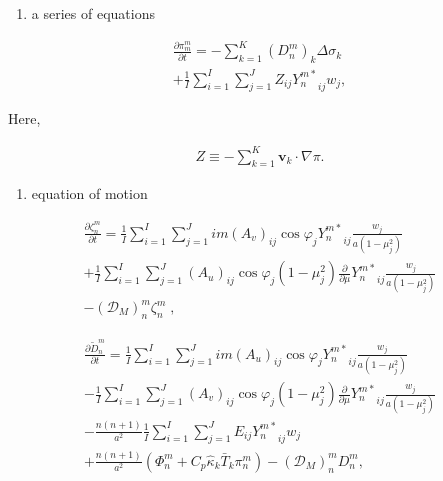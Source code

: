\begin{enumerate}
\def\labelenumi{\arabic{enumi}.}
\tightlist
\item
  a series of equations
\end{enumerate}

\begin{eqnarray}
  \frac{\partial \pi_m^m}{\partial t}
  =  - \sum_{k=1}^{K} (D_n^m)_k \Delta  \sigma_k  \\
     + \frac{1}{I} \sum_{i=1}^{I} \sum_{j=1}^{J}  
               Z_{ij} {Y_n^{m *}}_{ij} w_j  ,
\end{eqnarray}

Here,

\begin{eqnarray}
Z \equiv - \sum_{k=1}^{K} \mathbf{v}_k \cdot \nabla \pi .
\end{eqnarray}

\begin{enumerate}
\def\labelenumi{\arabic{enumi}.}
\setcounter{enumi}{1}
\tightlist
\item
  equation of motion
\end{enumerate}

\begin{eqnarray}
  \frac{\partial \zeta_n^m}{\partial t}
   =  \frac{1}{I} \sum_{i=1}^{I} \sum_{j=1}^{J}  
          im (A_v)_{ij} \cos\varphi_j
          {Y_n^{m *}}_{ij}
         \frac{w_j}{a(1-\mu_j^{2})}
          \\
   +    \frac{1}{I} \sum_{i=1}^{I} \sum_{j=1}^{J}  
          (A_u)_{ij} \cos\varphi_j
          (1-\mu_j^2)
          \frac{\partial }{\partial \mu} {Y_n^{m *}}_{ij}
          \frac{w_j}{a(1-\mu_j^{2})}
          \\
   -   ({\mathcal D}_M)_n^m \zeta_n^m  \; ,
\end{eqnarray}

\begin{eqnarray}
  \frac{\partial \tilde{D}_n^m}{\partial t}
   =  \frac{1}{I} \sum_{i=1}^{I} \sum_{j=1}^{J}  
          im (A_u)_{ij} \cos\varphi_j
          {Y_n^{m *}}_{ij}
         \frac{w_j}{a(1-\mu_j^{2})}
          \\
   -    \frac{1}{I} \sum_{i=1}^{I} \sum_{j=1}^{J}  
          (A_v)_{ij} \cos\varphi_j
          (1-\mu_j^2)
          \frac{\partial }{\partial \mu} {Y_n^{m *}}_{ij}
          \frac{w_j}{a(1-\mu_j^{2})}
          \\
   -   \frac{n(n+1)}{a^{2}}
         \frac{1}{I} \sum_{i=1}^{I} \sum_{j=1}^{J}  
          E_{ij} {Y_n^{m *}}_{ij} w_j
          \\
   +   \frac{n(n+1)}{a^{2}}
          ( \Phi_n^m + C_{p} \hat{\kappa}_k \bar{T}_k \pi_n^m )
          -  ({\mathcal D}_M)_n^m D_n^m  ,
\end{eqnarray}

